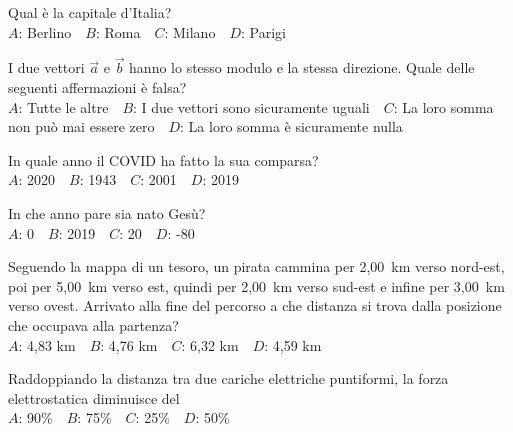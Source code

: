 \def\mcquestionnumber{4}


\mcquestionheader Qual è la capitale d’Italia?\\
{$A$}: Berlino\ \ {$B$}: Roma\ \ {$C$}: Milano\ \ {$D$}: Parigi\ \ 

\mcquestionfooter



\def\mcquestionnumber{5}


\mcquestionheader I due vettori $\vec{a}$ e $\vec{b}$ hanno lo stesso modulo e la stessa direzione. Quale delle seguenti affermazioni è falsa?\\
{$A$}: Tutte le altre\ \ {$B$}: I due vettori sono sicuramente uguali\ \ {$C$}: La loro somma non può mai essere zero\ \ {$D$}: La loro somma è sicuramente nulla\ \ 

\mcquestionfooter



\def\mcquestionnumber{6}


\mcquestionheader In quale anno il COVID ha fatto la sua comparsa?\\
{$A$}: 2020\ \ {$B$}: 1943\ \ {$C$}: 2001\ \ {$D$}: 2019\ \ 

\mcquestionfooter



\def\mcquestionnumber{7}


\mcquestionheader In che anno pare sia nato Gesù?\\
{$A$}: 0\ \ {$B$}: 2019\ \ {$C$}: 20\ \ {$D$}: -80\ \ 

\mcquestionfooter



\def\mcquestionnumber{8}


\mcquestionheader Seguendo la mappa di un tesoro, un pirata cammina per 2,00~km verso nord-est, poi per 5,00~km verso est, quindi per 2,00~km verso sud-est e infine per 3,00~km verso ovest. Arrivato alla fine del percorso a che distanza si trova dalla posizione che occupava alla partenza?\\
{$A$}: 4,83 km\ \ {$B$}: 4,76 km\ \ {$C$}: 6,32 km\ \ {$D$}: 4,59 km\ \ 

\mcquestionfooter



\def\mcquestionnumber{9}


\mcquestionheader Raddoppiando la distanza tra due cariche elettriche puntiformi, la forza elettrostatica diminuisce del\\
{$A$}: 90\%\ \ {$B$}: 75\%\ \ {$C$}: 25\%\ \ {$D$}: 50\%\ \ 

